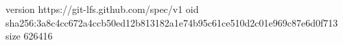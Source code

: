version https://git-lfs.github.com/spec/v1
oid sha256:3a8c4cc672a4ccb50ed12b813182a1e74b95c61ce510d2c01e969c87e6d0f713
size 626416
